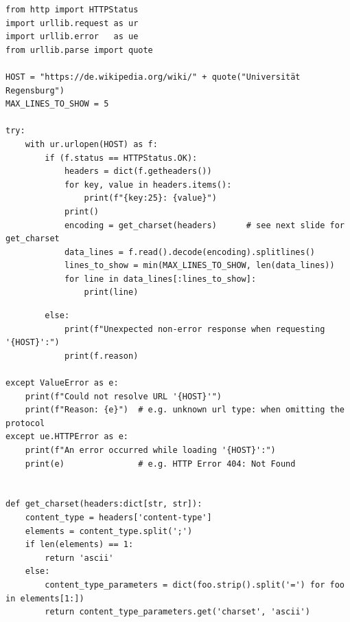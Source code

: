 \begin{frame}[fragile]
%
\vspace{-6pt}
\begin{codebox}
\begin{verbatim}
from http import HTTPStatus
import urllib.request as ur
import urllib.error   as ue
from urllib.parse import quote

HOST = "https://de.wikipedia.org/wiki/" + quote("Universität Regensburg")
MAX_LINES_TO_SHOW = 5

try:
    with ur.urlopen(HOST) as f:
        if (f.status == HTTPStatus.OK):
            headers = dict(f.getheaders())
            for key, value in headers.items():
                print(f"{key:25}: {value}")
            print()
            encoding = get_charset(headers)      # see next slide for get_charset
            data_lines = f.read().decode(encoding).splitlines()
            lines_to_show = min(MAX_LINES_TO_SHOW, len(data_lines))
            for line in data_lines[:lines_to_show]:
                print(line)
\end{verbatim}
\end{codebox}
%
\end{frame}


\begin{frame}[fragile]
%
\vspace{-6pt}
\begin{codebox}[... continued]
\begin{verbatim}
        else:
            print(f"Unexpected non-error response when requesting '{HOST}':")
            print(f.reason)

except ValueError as e:
    print(f"Could not resolve URL '{HOST}'")
    print(f"Reason: {e}")  # e.g. unknown url type: when omitting the protocol
except ue.HTTPError as e:
    print(f"An error occurred while loading '{HOST}':")
    print(e)               # e.g. HTTP Error 404: Not Found


def get_charset(headers:dict[str, str]):
    content_type = headers['content-type']
    elements = content_type.split(';')
    if len(elements) == 1:
        return 'ascii'
    else:
        content_type_parameters = dict(foo.strip().split('=') for foo in elements[1:])
        return content_type_parameters.get('charset', 'ascii')
\end{verbatim}
\end{codebox}
%
\end{frame}

